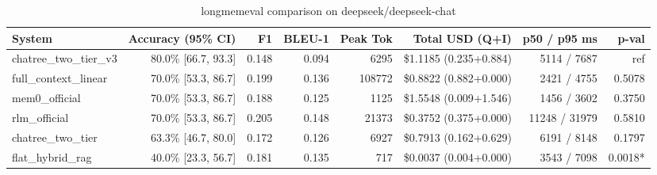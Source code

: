 \begin{table}[t]
\centering
\small
\begin{tabular}{lrrrrrrr}
\toprule
\textbf{System} & \textbf{Accuracy (95\% CI)} & \textbf{F1} & \textbf{BLEU-1} & \textbf{Peak Tok} & \textbf{Total USD (Q+I)} & \textbf{p50 / p95 ms} & \textbf{p-val} \\
\midrule
chatree\_two\_tier\_v3 & 80.0\% [66.7, 93.3] & 0.148 & 0.094 & 6295 & \$1.1185 (0.235+0.884) & 5114 / 7687 & ref \\
full\_context\_linear & 70.0\% [53.3, 86.7] & 0.199 & 0.136 & 108772 & \$0.8822 (0.882+0.000) & 2421 / 4755 & 0.5078 \\
mem0\_official & 70.0\% [53.3, 86.7] & 0.188 & 0.125 & 1125 & \$1.5548 (0.009+1.546) & 1456 / 3602 & 0.3750 \\
rlm\_official & 70.0\% [53.3, 86.7] & 0.205 & 0.148 & 21373 & \$0.3752 (0.375+0.000) & 11248 / 31979 & 0.5810 \\
chatree\_two\_tier & 63.3\% [46.7, 80.0] & 0.172 & 0.126 & 6927 & \$0.7913 (0.162+0.629) & 6191 / 8148 & 0.1797 \\
flat\_hybrid\_rag & 40.0\% [23.3, 56.7] & 0.181 & 0.135 & 717 & \$0.0037 (0.004+0.000) & 3543 / 7098 & 0.0018* \\
\bottomrule
\end{tabular}
\caption{longmemeval comparison on deepseek/deepseek-chat}
\label{tab:longmemeval}
\end{table}
